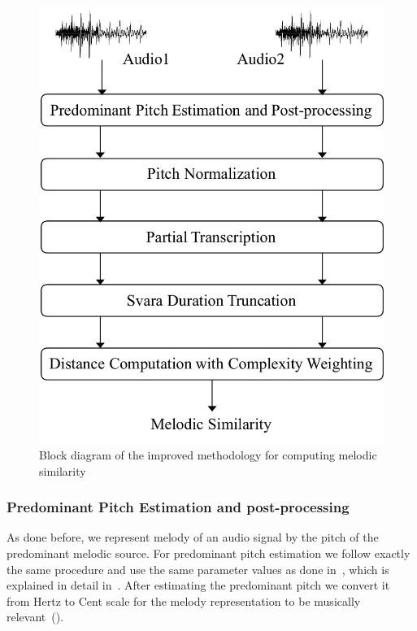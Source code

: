 \begin{figure}
	\begin{center}
		\includegraphics[width=\figSizeSixty]{ch06_patterns/figures/ImprovingSimilarity/melodic_similarity_improve_blockd.pdf}
	\end{center}
	\caption[Block diagram for an improved melodic similarity computation]{Block diagram of the improved methodology for computing melodic similarity} 
	\label{fig:block_diagram_melodic_similarity_improved}
\end{figure}

\subsubsection{Predominant Pitch Estimation and post-processing}
\label{sec:patterns_improving_similarity_melody_estimation}

As done before, we represent melody of an audio signal by the pitch of the predominant melodic source. For predominant pitch estimation we follow exactly the same procedure and use the same parameter values as done in~, which is explained in detail in~. After estimating the predominant pitch we convert it from Hertz to Cent scale for the melody representation to be musically relevant~().

